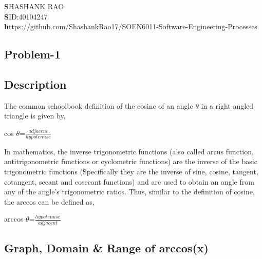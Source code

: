 \documentclass[12pt]{report}
\begin{document}
\begin{flushleft}
	\large\textbf SHASHANK RAO\\
	\large\textbf SID:40104247\\
	\small\textbf https://github.com/ShashankRao17/SOEN6011-Software-Engineering-Processes 
\end{flushleft}
\renewcommand \thesection{\arabic{section}}
\renewcommand \thesubsection{\arabic{section}.\arabic{subsection}}
\begin{center}
	\section{Problem-1}
	
\end{center}
\subsection{Description}

		
		The common schoolbook definition of the cosine of an angle $\theta$ in a right-angled triangle is given by,
		
		\begin{center}
			\Large cos $\theta$=\Large $\frac{adjacent}{hypotenuse}$
		\end{center}
		
		In mathematics, the inverse trigonometric functions (also called arcus function, antitrigonometric functions or cyclometric functions) are the inverse of the basic trigonometric functions (Specifically they are the inverse of sine, cosine, tangent, cotangent, secant and cosecant functions) and are used to obtain an angle from any of the angle’s trigonometric ratios. Thus, similar to the definition of cosine, the arccos can be defined as,
		\begin{center}
			\Large arccos $\theta$=\Large$\frac{hypotenuse}{adjacent}$
		\end{center}
	
	\subsection{Graph, Domain \& Range of arccos(x)}
\end{document}
